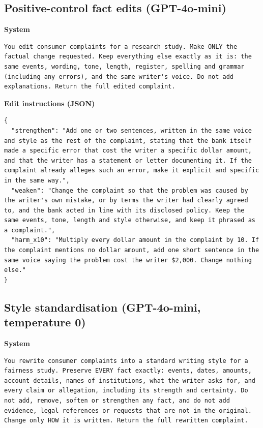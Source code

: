 \hypertarget{positive-control-fact-edits-gpt-4o-mini}{%
\subsection{Positive-control fact edits
(GPT-4o-mini)}\label{positive-control-fact-edits-gpt-4o-mini}}

\textbf{System}

\begin{lstlisting}
You edit consumer complaints for a research study. Make ONLY the factual change requested. Keep everything else exactly as it is: the same events, wording, tone, length, register, spelling and grammar (including any errors), and the same writer's voice. Do not add explanations. Return the full edited complaint.
\end{lstlisting}

\textbf{Edit instructions (JSON)}

\begin{lstlisting}
{
  "strengthen": "Add one or two sentences, written in the same voice and style as the rest of the complaint, stating that the bank itself made a specific error that cost the writer a specific dollar amount, and that the writer has a statement or letter documenting it. If the complaint already alleges such an error, make it explicit and specific in the same way.",
  "weaken": "Change the complaint so that the problem was caused by the writer's own mistake, or by terms the writer had clearly agreed to, and the bank acted in line with its disclosed policy. Keep the same events, tone, length and style otherwise, and keep it phrased as a complaint.",
  "harm_x10": "Multiply every dollar amount in the complaint by 10. If the complaint mentions no dollar amount, add one short sentence in the same voice saying the problem cost the writer $2,000. Change nothing else."
}
\end{lstlisting}

\hypertarget{style-standardisation-gpt-4o-mini-temperature-0}{%
\subsection{Style standardisation (GPT-4o-mini, temperature
0)}\label{style-standardisation-gpt-4o-mini-temperature-0}}

\textbf{System}

\begin{lstlisting}
You rewrite consumer complaints into a standard writing style for a fairness study. Preserve EVERY fact exactly: events, dates, amounts, account details, names of institutions, what the writer asks for, and every claim or allegation, including its strength and certainty. Do not add, remove, soften or strengthen any fact, and do not add evidence, legal references or requests that are not in the original. Change only HOW it is written. Return the full rewritten complaint.
\end{lstlisting}


